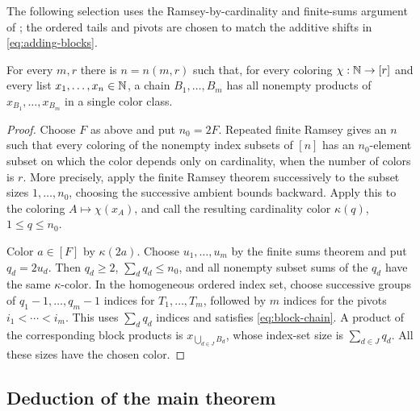 The following selection uses the Ramsey-by-cardinality and finite-sums
argument of \cite[Section~5, Steps~II--IV]{Alweiss}; the ordered tails
and pivots are chosen to match the additive shifts in
\eqref{eq:adding-blocks}.

\begin{lemma}\label{lem:chain-selection}
For every $m,r$ there is $n=n(m,r)$ such that, for every coloring
$\chi:\mathbb N\to[r]$ and every list $x_1,\ldots,x_n\in\mathbb N$, a chain
$B_1,\ldots,B_m$ has all nonempty products of
$x_{B_1},\ldots,x_{B_m}$ in a single color class.
\end{lemma}

\begin{proof}
Choose $F$ as above and put $n_0=2F$. Repeated finite Ramsey gives
an $n$ such that every coloring of the nonempty index subsets of
$[n]$ has an $n_0$-element subset on which the color depends only on
cardinality, when the number of colors is $r$. More precisely, apply
the finite Ramsey theorem successively to the subset sizes
$1,\ldots,n_0$, choosing the successive ambient bounds backward.
Apply this to the coloring $A\mapsto\chi(x_A)$, and call the
resulting cardinality color $\kappa(q)$, $1\le q\le n_0$.

Color $a\in[F]$ by $\kappa(2a)$. Choose $u_1,\ldots,u_m$ by the
finite sums theorem and put $q_d=2u_d$. Then $q_d\ge2$,
$\sum_dq_d\le n_0$, and all nonempty subset sums of the $q_d$ have
the same $\kappa$-color. In the homogeneous ordered index set,
choose successive groups of $q_1-1,\ldots,q_m-1$ indices for
$T_1,\ldots,T_m$, followed by $m$ indices for the pivots
$i_1<\cdots<i_m$. This uses $\sum_dq_d$ indices and satisfies
\eqref{eq:block-chain}. A product of the corresponding block
products is $x_{\bigcup_{d\in J}B_d}$, whose index-set size is
$\sum_{d\in J}q_d$. All these sizes have the chosen color.
\end{proof}

\subsection{Deduction of the main theorem}

